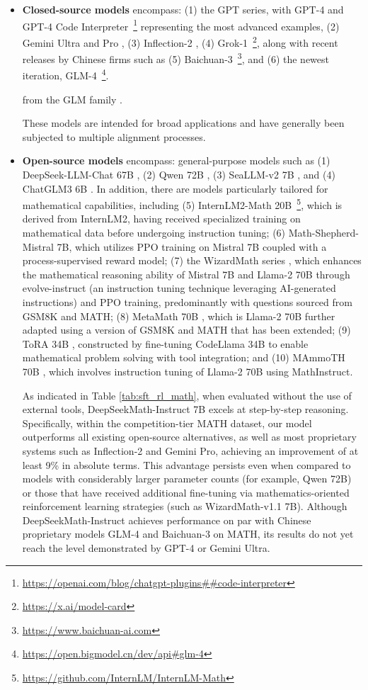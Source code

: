 \begin{itemize}[topsep=0pt]
\begin{itemize}[topsep=0pt]
    \item \textbf{Closed-source models} encompass: (1) the GPT series, with GPT-4 \citep{gpt4} and GPT-4 Code Interpreter~\footnote{\url{https://openai.com/blog/chatgpt-plugins\#\#code-interpreter}} representing the most advanced examples, (2) Gemini Ultra and Pro \citep{gemini}, (3) Inflection-2 \citep{inflection-2}, (4) Grok-1~\footnote{\url{https://x.ai/model-card}}, along with recent releases by Chinese firms such as (5) Baichuan-3~\footnote{\url{https://www.baichuan-ai.com}}, and (6) the newest iteration, GLM-4~\footnote{\url{https://open.bigmodel.cn/dev/api\#glm-4}}.

    from the GLM family \citep{glm}.

These models are intended for broad applications and have generally been subjected to multiple alignment processes. 
\item \textbf{Open-source models} encompass: general-purpose models such as (1) DeepSeek-LLM-Chat 67B \citep{deepseek-llm}, (2) Qwen 72B \citep{qwen}, (3) SeaLLM-v2 7B \citep{seallm}, and (4) ChatGLM3 6B \citep{chatglm3}. In addition, there are models particularly tailored for mathematical capabilities, including (5) InternLM2-Math 20B~\footnote{\url{https://github.com/InternLM/InternLM-Math}}, which is derived from InternLM2, having received specialized training on mathematical data before undergoing instruction tuning; (6) Math-Shepherd-Mistral 7B, which utilizes PPO training \citep{schulman2017proximal} on Mistral 7B \citep{mistral} coupled with a process-supervised reward model; (7) the WizardMath series \citep{wizardmath}, which enhances the mathematical reasoning ability of Mistral 7B and Llama-2 70B \citep{llama2} through evolve-instruct (an instruction tuning technique leveraging AI-generated instructions) and PPO training, predominantly with questions sourced from GSM8K and MATH; (8) MetaMath 70B \citep{metamath}, which is Llama-2 70B further adapted using a version of GSM8K and MATH that has been extended; (9) ToRA 34B \cite{tora}, constructed by fine-tuning CodeLlama 34B to enable mathematical problem solving with tool integration; and (10) MAmmoTH 70B \citep{MathInstruct}, which involves instruction tuning of Llama-2 70B using MathInstruct.

As indicated in Table \ref{tab:sft_rl_math}, when evaluated without the use of external tools, DeepSeekMath-Instruct 7B excels at step-by-step reasoning. Specifically, within the competition-tier MATH dataset, our model outperforms all existing open-source alternatives, as well as most proprietary systems such as Inflection-2 and Gemini Pro, achieving an improvement of at least 9\% in absolute terms. This advantage persists even when compared to models with considerably larger parameter counts (for example, Qwen 72B) or those that have received additional fine-tuning via mathematics-oriented reinforcement learning strategies (such as WizardMath-v1.1 7B). Although DeepSeekMath-Instruct achieves performance on par with Chinese proprietary models GLM-4 and Baichuan-3 on MATH, its results do not yet reach the level demonstrated by GPT-4 or Gemini Ultra.


\end{itemize}
\end{itemize}
